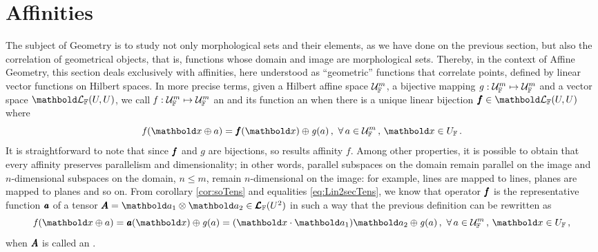 \section{Affinities}
The subject of Geometry is to study not only morphological sets and their elements, as we have done on the previous section, but also the correlation of geometrical objects, that is, functions whose domain and image are morphological sets. Thereby, in the context of Affine Geometry, this section deals exclusively with affinities, here understood as ``geometric'' functions that correlate points, defined by linear vector functions on Hilbert spaces. In more precise terms, given a Hilbert affine space $\eamd{U}{F}{m}$, a bijective mapping $\map{\mathit{g}}{\eamd{U}{F}{m}}{\eamd{U}{F}{m}}$ and a vector space $\evl{\cam{F}}{U}{U}$, we call  $\map{\mathit{f}}{\eamd{U}{F}{m}}{\eamd{U}{F}{m}}$ an  and its function an  when there is a unique linear bijection $\vtf{f}\in\evl{\cam{F}}{U}{U}$ where
\begin{equation}\label{eq:affty}
\fua{\mathit{f}}{\vto{x}\oplus a}=\fua{\vtf{f}}{\vto{x}}\oplus\fua{\mathit{g}}{a}\,,\,\,\forall\,a\in\eamd{U}{F}{m}\,,\,\vto{x}\in U_\cam{F}\,.
\end{equation}
It is straightforward to note that since $\vtf{f}$ and $\mathit{g}$ are bijections, so results affinity $\mathit{f}$. Among other properties, it is possible to obtain that every affinity preserves parallelism and dimensionality; in other words, parallel subspaces on the  domain remain parallel on the image and $n$-dimensional subspaces on the domain, $n\leq m$, remain $n$-dimensional on the image: for example, lines are mapped to lines, planes are mapped to planes and so on. From corollary \ref{cor:soTens} and equalities \eqref{eq:Lin2secTens}, we know that operator $\vtf{f}$ is the representative function $\tnr{\mathit{a}}$ of a tensor $\tnr{A}=\vto{a}_1\otimes\vto{a}_2\in\ete{\cam{F}}{U^2}$ in such a way that the previous definition can be rewritten as
\begin{equation}
\fua{\mathit{f}}{\vto{x}\oplus a}=\fua{\tnr{\mathit{a}}}{\vto{x}}\oplus\fua{\mathit{g}}{a}=(\vto{x}\cdot\vto{a}_1)\vto{a}_2\oplus\fua{\mathit{g}}{a}\,,\,\,\forall\,a\in\eamd{U}{F}{m}\,,\,\vto{x}\in U_\cam{F}\,,
\end{equation}
when $\tnr{A}$ is called an .


